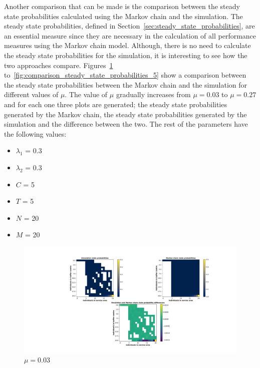 Another comparison that can be made is the comparison between the steady state
probabilities calculated using the Markov chain and the simulation.
The steady state probabilities, defined in
Section~\ref{sec:steady_state_probabilities}, are an essential measure since
they are necessary in the calculation of all performance measures using the
Markov chain model.
Although, there is no need to calculate the steady state probabilities for the
simulation, it is interesting to see how the two approaches compare.
Figures~\ref{fig:comparison_steady_state_probabilities_1}
to~\ref{fig:comparison_steady_state_probabilities_5} show a comparison between
the steady state probabilities between the Markov chain and the simulation
for different values of \(\mu\).
The value of \(\mu\) gradually increases from \(\mu = 0.03\) to \(\mu = 0.27\)
and for each one three plots are generated; the steady state probabilities
generated by the Markov chain, the steady state probabilities generated by the
simulation and the difference between the two.
The rest of the parameters have the following values:

\begin{multicols}{2}
    \begin{itemize}
        \item \(\lambda_1\) = 0.3
        \item \(\lambda_2\) = 0.3
        \item \(C\) = 5
        \item \(T\) = 5
        \item \(N\) = 20
        \item \(M\) = 20
    \end{itemize}    
\end{multicols}


\begin{figure}[H]
    \includegraphics[width=\textwidth, trim=200 60 170 60, clip]{chapters/03_queueing_model/img/numeric_results_and_timings/steady_state_probabilities/main_1.pdf}
    \caption{\(\mu = 0.03\)}
    \label{fig:comparison_steady_state_probabilities_1}
\end{figure}

